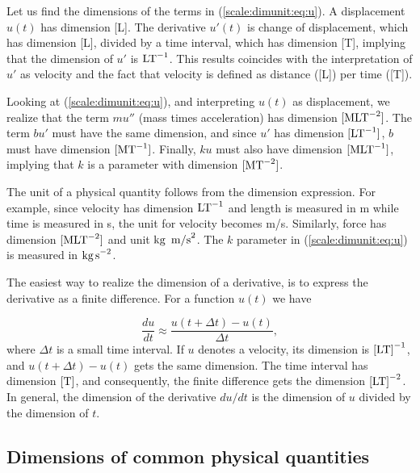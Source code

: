 \documentclass[graybox,envcountchap,sectrefs,final]{svmonodo}
\newenvironment{notice_mdfboxadmon}[1][]{
\begin{notice_mdfboxmdframed}[frametitle=#1]
}
{
\end{notice_mdfboxmdframed}
}
\begin{document}
Let us find the dimensions of the terms in (\ref{scale:dimunit:eq:u}).
A displacement $u(t)$ has dimension [L]. The derivative $u'(t)$ is
change of displacement, which has dimension [L], divided by a time
interval, which has dimension [T], implying that the dimension of $u'$
is $\hbox{LT}^{-1}$. This results coincides with the interpretation of
$u'$ as velocity and the fact that velocity is defined as distance
([L]) per time ([T]).

Looking at (\ref{scale:dimunit:eq:u}), and interpreting $u(t)$ as
displacement, we realize that the term $mu''$ (mass times
acceleration) has dimension $[\hbox{MLT}^{-2}]$.  The term $bu'$ must
have the same dimension, and since $u'$ has dimension
$[\hbox{LT}^{-1}]$, $b$ must have dimension $[\hbox{MT}^{-1}]$.
Finally, $ku$ must also have dimension $[\hbox{MLT}^{-1}]$, implying
that $k$ is a parameter with dimension $[\hbox{MT}^{-2}]$.

The unit of a physical quantity follows from the dimension expression.
For example, since velocity has dimension $\hbox{LT}^{-1}$ and length
is measured in m while time is measured in s, the unit for velocity
becomes m/s. Similarly, force has dimension $[\hbox{MLT}^{-2}]$ and
unit $\hbox{kg\, m/s}^2$. The $k$ parameter in
(\ref{scale:dimunit:eq:u}) is measured in $\hbox{kg\,s}^{-2}$.


\begin{notice_mdfboxadmon}
The easiest way to realize the dimension of a derivative, is to express
the derivative as a finite difference. For a function $u(t)$ we have

\[ \frac{du}{dt} \approx \frac{u(t+\Delta t)- u(t)}{\Delta t},\]
where $\Delta t$ is a small time interval.
If $u$ denotes a velocity, its dimension is $\hbox{[LT]}^{-1}$,
and $u(t+\Delta t) - u(t)$ gets the same dimension. The time
interval has dimension $\hbox{[T]}$, and consequently, the
finite difference gets the dimension $\hbox{[LT]}^{-2}$.
In general, the dimension of the derivative $du/dt$ is the dimension
of $u$ divided by the dimension of $t$.
\end{notice_mdfboxadmon}




\subsection{Dimensions of common physical quantities}
\label{scale:dimunit:tables}

\end{document}
